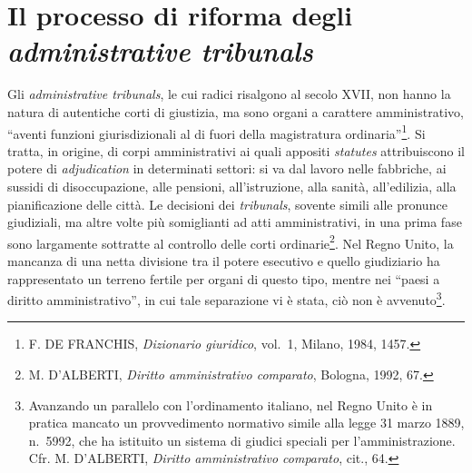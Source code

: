 \documentclass[12pt,it,a4paper,]{report}
\begin{document}
\hypertarget{il-processo-di-riforma-degli-administrative-tribunals}{%
\section{\texorpdfstring{Il processo di riforma degli
\emph{administrative
tribunals}}{Il processo di riforma degli administrative tribunals}}\label{il-processo-di-riforma-degli-administrative-tribunals}}

Gli \emph{administrative tribunals}, le cui radici risalgono al secolo
XVII, non hanno la natura di autentiche corti di giustizia, ma sono
organi a carattere amministrativo, ``aventi funzioni giurisdizionali al
di fuori della magistratura ordinaria''\footnote{F. DE FRANCHIS,
  \emph{Dizionario giuridico}, vol.~1, Milano, 1984, 1457.}. Si tratta,
in origine, di corpi amministrativi ai quali appositi \emph{statutes}
attribuiscono il potere di \emph{adjudication} in determinati settori:
si va dal lavoro nelle fabbriche, ai sussidi di disoccupazione, alle
pensioni, all'istruzione, alla sanità, all'edilizia, alla pianificazione
delle città. Le decisioni dei \emph{tribunals}, sovente simili alle
pronunce giudiziali, ma altre volte più somiglianti ad atti
amministrativi, in una prima fase sono largamente sottratte al controllo
delle corti ordinarie\footnote{M. D'ALBERTI, \emph{Diritto
  amministrativo comparato}, Bologna, 1992, 67.}. Nel Regno Unito, la
mancanza di una netta divisione tra il potere esecutivo e quello
giudiziario ha rappresentato un terreno fertile per organi di questo
tipo, mentre nei ``paesi a diritto amministrativo'', in cui tale
separazione vi è stata, ciò non è avvenuto\footnote{Avanzando un
  parallelo con l'ordinamento italiano, nel Regno Unito è in pratica
  mancato un provvedimento normativo simile alla legge 31 marzo 1889,
  n.~5992, che ha istituito un sistema di giudici speciali per
  l'amministrazione. Cfr. M. D'ALBERTI, \emph{Diritto amministrativo
  comparato}, cit., 64.}.
\end{document}
